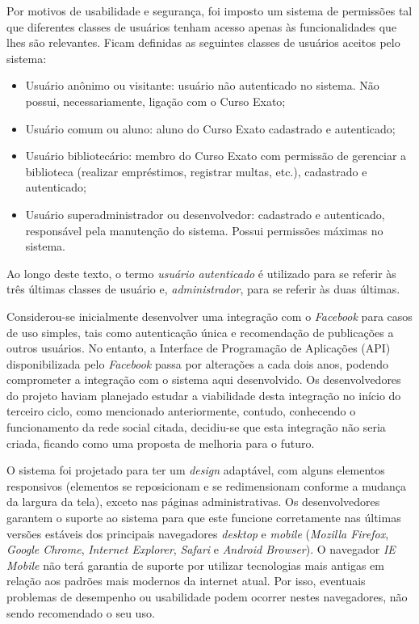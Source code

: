 \documentclass[a4paper]{article}
\begin{document}
Por motivos de usabilidade e segurança, foi imposto um sistema de permissões tal que diferentes classes de usuários tenham acesso apenas às funcionalidades que lhes são relevantes. Ficam definidas as seguintes classes de usuários aceitos pelo sistema:
\begin{itemize}
\item Usuário anônimo ou visitante: usuário não autenticado no sistema. Não possui, necessariamente, ligação com o Curso Exato;
\item Usuário comum ou aluno: aluno do Curso Exato cadastrado e autenticado;
\item Usuário bibliotecário: membro do Curso Exato com permissão de gerenciar a biblioteca (realizar empréstimos, registrar multas, etc.), cadastrado e autenticado;
\item Usuário superadministrador ou desenvolvedor: cadastrado e autenticado, responsável pela manutenção do sistema. Possui permissões máximas no sistema.
\end{itemize}
Ao longo deste texto, o termo \emph{usuário autenticado} é utilizado para se referir às três últimas classes de usuário e, \emph{administrador}, para se referir às duas últimas.

Considerou-se inicialmente desenvolver uma integração com o \textit{Facebook} para casos de uso simples, tais como autenticação única e recomendação de publicações a outros usuários. No entanto, a Interface de Programação de Aplicações (API) disponibilizada pelo \textit{Facebook} passa por alterações a cada dois anos, podendo comprometer a integração com o sistema aqui desenvolvido. Os  desenvolvedores do projeto haviam planejado estudar a viabilidade desta integração no início do terceiro ciclo, como mencionado anteriormente, contudo, conhecendo o funcionamento da rede social citada, decidiu-se que esta integração não seria criada, ficando como uma proposta de melhoria para o futuro.

O sistema foi projetado para ter um \textit{design} adaptável, com alguns elementos responsivos (elementos se reposicionam e se redimensionam conforme a mudança da largura da tela), exceto nas páginas administrativas. Os desenvolvedores garantem o suporte ao sistema para que este funcione corretamente nas últimas versões estáveis dos principais navegadores \textit{desktop} e \textit{mobile} (\textit{Mozilla Firefox}, \textit{Google Chrome}, \textit{Internet Explorer}, \textit{Safari} e \textit{Android Browser}). O navegador \textit{IE Mobile} não terá garantia de suporte por utilizar tecnologias mais antigas em relação aos padrões mais modernos da internet atual. Por isso, eventuais problemas de desempenho ou usabilidade podem ocorrer nestes navegadores, não sendo recomendado o seu uso.
\end{document}
